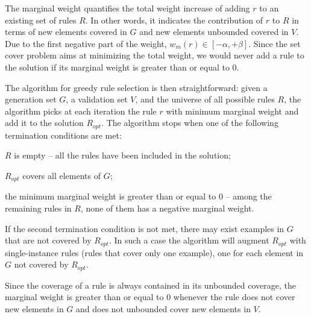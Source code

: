 The marginal weight quantifies the total weight increase of adding $r$ to an existing set of rules $R$. In other words, it indicates the contribution of $r$ to $R$ in terms of new elements covered in $G$ and new elements unbounded covered in $V$. Due to the first negative part of the weight, $w_m(r) \in [-\alpha,+\beta]$. Since the set cover problem aims at minimizing the total weight, we would never add a rule to the solution if its marginal weight is greater than or equal to $0$.

%

The algorithm for greedy rule selection is then straightforward:
given a generation set $G$, a validation set $V$, and the universe of all possible rules $R$, the algorithm picks at each iteration the rule $r$ with minimum marginal weight and add it to the solution $R_{opt}$.
The algorithm stops when one of the following termination conditions are met:
\begin{inparaenum} [\itshape1)]
	\item $R$ is empty -- all the rules have been included in the solution;
	\item $R_{opt}$ covers all elements of $G$;
	\item the minimum marginal weight is greater than or equal to $0$ -- among the remaining rules in $R$, none of them has a negative marginal weight.
\end{inparaenum}
If the second termination condition is not met, there may exist examples in $G$ that are not covered by $R_{opt}$. In such a case the algorithm will augment $R_{opt}$ with single-instance rules (rules that cover only one example), one for each element in $G$ not covered by $R_{opt}$.

Since the coverage of a rule is always contained in its unbounded coverage, the marginal weight is greater than or equal to $0$ whenever the rule does not cover new elements in $G$ and does not unbounded cover new elements in $V$. 

